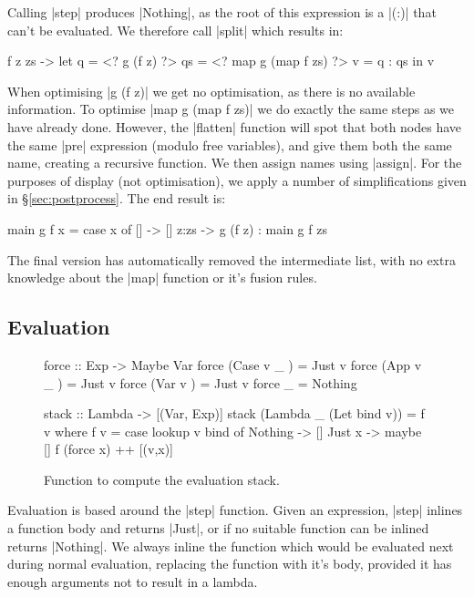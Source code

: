 \documentclass[draft]{sigplanconf}
\begin{document}
Calling |step| produces |Nothing|, as the root of this expression is a |(:)| that can't be evaluated. We therefore call |split| which results in:

\begin{code}
\g f z zs ->  let  q = <? g (f z) ?>
                   qs = <? map g (map f zs) ?>
                   v = q : qs
              in   v
\end{code}

When optimising |g (f z)| we get no optimisation, as there is no available information. To optimise |map g (map f zs)| we do exactly the same steps as we have already done. However, the |flatten| function will spot that both nodes have the same |pre| expression (modulo free variables), and give them both the same name, creating a recursive function. We then assign names using |assign|. For the purposes of display (not optimisation), we apply a number of simplifications given in \S\ref{sec:postprocess}. The end result is:

\begin{code}
main g f x = case  x of
                   []    -> []
                   z:zs  -> g (f z) : main g f zs
\end{code}

The final version has automatically removed the intermediate list, with no extra knowledge about the |map| function or it's fusion rules.

\subsection{Evaluation}
\label{sec:eval}

\begin{figure}
\begin{code}
force :: Exp -> Maybe Var
force (Case  v _  )  = Just v
force (App   v _  )  = Just v
force (Var   v    )  = Just v
force _              = Nothing

stack :: Lambda -> [(Var, Exp)]
stack (Lambda _ (Let bind v)) = f v
    where f v = case  lookup v bind of
                      Nothing  -> []
                      Just x   -> maybe [] f (force x) ++ [(v,x)]
\end{code}
\caption{Function to compute the evaluation stack.}
\label{fig:stack}
\end{figure}

Evaluation is based around the |step| function. Given an expression, |step| inlines a function body and returns |Just|, or if no suitable function can be inlined returns |Nothing|. We always inline the function which would be evaluated next during normal evaluation, replacing the function with it's body, provided it has enough arguments not to result in a lambda.
\end{document}
